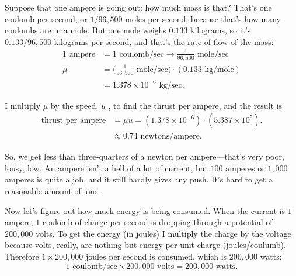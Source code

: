 \documentclass[11pt,oneside]{article}
\begin{document}
Suppose that one ampere is going out: how much mass is that? That's one coulomb per second, or \(1/96,\!500\) moles per second, because that's how many coulombs are in a mole. But one mole weighs \(0.133\) kilograms, so it's \(0.133/96,\!500\) kilograms per second, and that's the rate of flow of the mass: 
\begin{equation*} \begin{aligned} 1\text{ ampere} &= 1\text{ coulomb/sec} \rightarrow \frac{1}{96,\!500}\text{ mole/sec}\\[1ex] \mu &= \bigg(\frac{1}{96,\!500}\text{ mole/sec}\bigg)\cdot(0.133\text{ kg/mole})\\[1.25ex] &= 1.378 \times 10^{-6}\text{ kg/sec}. \end{aligned} \tag{3.24}
\label{Eq:TIPS:3:24} \end{equation*}
\par

I multiply \(\mu\) by the speed, \(u\) , to find the thrust per ampere, and the result is 
\begin{equation*} \begin{aligned} \text{thrust per ampere} &= \mu u = (1.378 \times 10^{-6})\cdot(5.387 \times 10^5).\\[1ex] &\approx 0.74\text{ newtons/ampere}. \end{aligned} \tag{3.25}
\label{Eq:TIPS:3:25} \end{equation*}
\par

So, we get less than three-quarters of a newton per ampere---that's very poor, lousy, low. An ampere isn't a hell of a lot of current, but \(100\) amperes or \(1,\!000\) amperes is quite a job, and it still hardly gives any push. It's hard to get a reasonable amount of ions.\par

Now let's figure out how much energy is being consumed. When the current is \(1\) ampere, \(1\) coulomb of charge per second is dropping through a potential of \(200,\!000\) volts. To get the energy (in joules) I multiply the charge by the voltage because volts, really, are nothing but energy per unit charge (joules/coulumb). Therefore \(1\times200,\!000\) joules per second is consumed, which is \(200,\!000\) watts: 
\begin{equation*} \tag{3.26}
\label{Eq:TIPS:3:26} 1\text{ coulomb/sec}\times200,\!000\text{ volts} = 200,\!000\text{ watts}. \end{equation*}
\par
\end{document}
